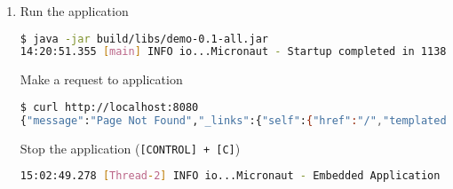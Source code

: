 \begin{enumerate}
\item Run the application

\begin{lstlisting}[language=bash]
$ java -jar build/libs/demo-0.1-all.jar
14:20:51.355 [main] INFO io...Micronaut - Startup completed in 1138ms. Server Running: http://localhost:8080
\end{lstlisting}

Make a request to application

\begin{lstlisting}[language=bash]
$ curl http://localhost:8080
{"message":"Page Not Found","_links":{"self":{"href":"/","templated":false}}}
\end{lstlisting}

Stop the application (\texttt{[CONTROL] + [C]})

\begin{lstlisting}[language=bash]
15:02:49.278 [Thread-2] INFO io...Micronaut - Embedded Application shutting down
\end{lstlisting}

\end{enumerate}